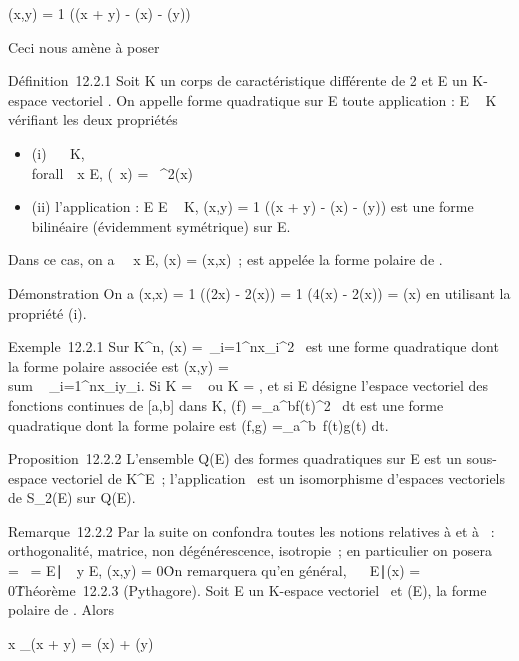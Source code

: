 \documentclass[]{article}
\begin{document}
\phi(x,y) = 1  (\Phi(x + y) - \Phi(x) - \Phi(y))

Ceci nous amène à poser

Définition~12.2.1 Soit K un corps de caractéristique différente de 2 et
E un K-espace vectoriel . On appelle forme quadratique sur E toute
application \Phi : E \rightarrow~ K vérifiant les deux propriétés

\begin{itemize}
\itemsep1pt\parskip0pt
\item
  (i) \forall~\lambda~ \in K, \\forall~~x \in
  E, \Phi(\lambda~x) = \lambda~^2\Phi(x)
\item
  (ii) l'application \phi : E \times E \rightarrow~ K, \phi(x,y) = 1  (\Phi(x + y) - \Phi(x) - \Phi(y)) est une forme bilinéaire (évidemment
  symétrique) sur E.
\end{itemize}

Dans ce cas, on a \forall~~x \in E, \Phi(x) = \phi(x,x)~; \phi
est appelée la forme polaire de \Phi.

Démonstration On a \phi(x,x) = 1  (\Phi(2x) - 2\Phi(x))
= 1  (4\Phi(x) - 2\Phi(x)) = \Phi(x) en utilisant la
propriété (i).

Exemple~12.2.1 Sur K^n, \Phi(x) =\
\sum  _i=1^nx_i^2~
est une forme quadratique dont la forme polaire associée est \phi(x,y)
= \\sum ~
_i=1^nx_iy_i. Si K = ~ ou K = , et si E
désigne l'espace vectoriel des fonctions continues de [a,b] dans K,
\Phi(f) =\int  _a^bf(t)^2~
dt est une forme quadratique dont la forme polaire est \phi(f,g)
=\int  _a^b~f(t)g(t) dt.

Proposition~12.2.2 L'ensemble Q(E) des formes quadratiques sur E est un
sous-espace vectoriel de K^E~; l'application
\phi\mapsto~\Phi est un isomorphisme d'espaces vectoriels
de S_2(E) sur Q(E).

Remarque~12.2.2 Par la suite on confondra toutes les notions relatives à
\phi et à \Phi~: orthogonalité, matrice, non dégénérescence, isotropie~; en
particulier on posera
\mathrmKer~\Phi
= \mathrmKer~\phi =
\x \in
E∣\forall~~y \in E, \phi(x,y) =
0\. On remarquera qu'en général,
\mathrmKer\Phi\mathrel\neq~~\x
\in E∣\Phi(x) = 0\.

Théorème~12.2.3 (Pythagore). Soit E un K-espace vectoriel ~et \Phi \inQ(E), \phi
la forme polaire de \Phi. Alors

x \bot_\phiy \Leftrightarrow \Phi(x + y) = \Phi(x) + \Phi(y)
\end{document}

